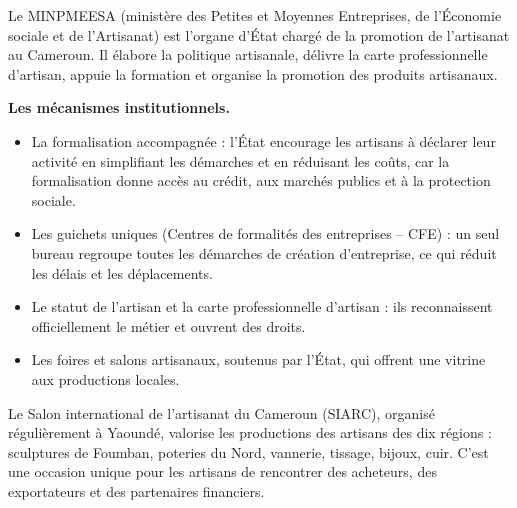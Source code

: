 \documentclass[11pt]{article}
\newcommand{\cle}[1]{{\popxbold\color{popdark}#1}}
\begin{document}
\begin{definition}[Le MINPMEESA]
Le \cle{MINPMEESA} (ministère des Petites et Moyennes Entreprises, de l'Économie sociale et de l'Artisanat) est l'organe d'État chargé de la promotion de l'artisanat au Cameroun. Il élabore la politique artisanale, délivre la carte professionnelle d'artisan, appuie la formation et organise la promotion des produits artisanaux.
\end{definition}

\textbf{Les mécanismes institutionnels.}

\begin{itemize}
\item La \cle{formalisation accompagnée} : l'État encourage les artisans à déclarer leur activité en simplifiant les démarches et en réduisant les coûts, car la formalisation donne accès au crédit, aux marchés publics et à la protection sociale.
\item Les \cle{guichets uniques} (Centres de formalités des entreprises -- CFE) : un seul bureau regroupe toutes les démarches de création d'entreprise, ce qui réduit les délais et les déplacements.
\item Le \cle{statut de l'artisan} et la carte professionnelle d'artisan : ils reconnaissent officiellement le métier et ouvrent des droits.
\item Les \cle{foires et salons artisanaux}, soutenus par l'État, qui offrent une vitrine aux productions locales.
\end{itemize}

\begin{savaistu}
Le Salon international de l'artisanat du Cameroun (SIARC), organisé régulièrement à Yaoundé, valorise les productions des artisans des dix régions : sculptures de Foumban, poteries du Nord, vannerie, tissage, bijoux, cuir. C'est une occasion unique pour les artisans de rencontrer des acheteurs, des exportateurs et des partenaires financiers.
\end{savaistu}
\end{document}
